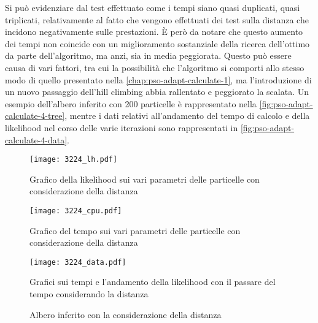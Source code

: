 Si può evidenziare dal test effettuato come i tempi siano quasi duplicati, quasi triplicati, relativamente al fatto che vengono effettuati dei test sulla distanza che incidono negativamente sulle prestazioni. È però da notare che questo aumento dei tempi non coincide con un miglioramento sostanziale della ricerca dell'ottimo da parte dell'algoritmo, ma anzi, sia in media peggiorata. Questo può essere causa di vari fattori, tra cui la possibilità che l'algoritmo si comporti allo stesso modo di quello presentato nella \autoref{chap:pso-adapt-calculate-1}, ma l'introduzione di un nuovo passaggio dell'hill climbing abbia rallentato e peggiorato la scalata. 
Un esempio dell'albero inferito con 200 particelle è rappresentato nella \autoref{fig:pso-adapt-calculate-4-tree}, mentre i dati relativi all'andamento del tempo di calcolo e della likelihood nel corso delle varie iterazioni sono rappresentati in \autoref{fig:pso-adapt-calculate-4-data}.

\begin{figure}[!h]
  \centering
  \begin{minipage}{.45 \textwidth}
  \centering
  \texttt{[image: 3224\_lh.pdf]}
  \caption{Grafico della likelihood sui vari parametri delle particelle con considerazione della distanza}
  \end{minipage}
  \begin{minipage}{.45 \textwidth}
    \centering
    \texttt{[image: 3224\_cpu.pdf]}
    \caption{Grafico del tempo sui vari parametri delle particelle con considerazione della distanza}
  \end{minipage}
  \label{fig:pso-adapt-calculate-1-graph}
\end{figure}

\begin{figure}[!h]
  \centering
  \texttt{[image: 3224\_data.pdf]}
  \caption{Grafici sui tempi e l'andamento della likelihood con il passare del tempo considerando la distanza}
  \label{fig:pso-adapt-calculate-4-data}
\end{figure}

\begin{figure}[!h]
  \centering
  \caption{Albero inferito con la considerazione della distanza}
  \label{fig:pso-adapt-calculate-4-tree}
\end{figure}
